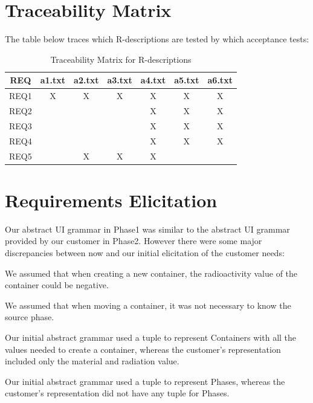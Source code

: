 \newpage
\section{Traceability Matrix}

The table below traces which R-descriptions are tested by which acceptance tests:

\begin{table}[h]
\centering
\begin{tabular}{| c | c | c | c | c | c | c |}
	\cline{1-7}
	\textbf{REQ} & \textbf{a1.txt} & \textbf{a2.txt} & \textbf{a3.txt} & \textbf{a4.txt} & \textbf{a5.txt} & \textbf{a6.txt} \\ \hline
	REQ1 & X & X & X & X & X & X \\ \hline
	REQ2 & & & & X & X & X \\ \hline
	REQ3 & & & & X & X & X \\ \hline
	REQ4 & & & & X & X & X \\ \hline
	REQ5 & & X & X & X & & \\ \hline
\end{tabular}
\caption {Traceability Matrix for R-descriptions}
\label{tbl:trace_matrix}
\end{table}

\newpage
\section{Requirements Elicitation}

Our abstract UI grammar in Phase1 was similar to the abstract UI grammar provided by our customer in Phase2. However there were some major discrepancies between now and our initial elicitation of the customer needs:

\smallskip

\begin{mylist}
\item We assumed that when creating a new container, the radioactivity value of the container could be negative.
\item We assumed that when moving a container, it was not necessary to know the source phase.
\item Our initial abstract grammar used a tuple to represent Containers with all the values needed to create a container, whereas the customer's representation included only the material and radiation value.
\item Our initial abstract grammar used a tuple to represent Phases, whereas the customer's representation did not have any tuple for Phases.
\end{mylist}

